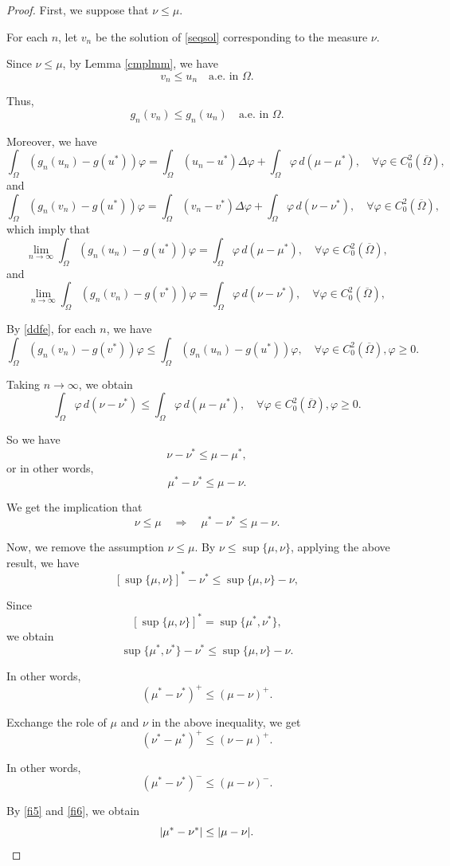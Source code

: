 \documentclass[a4paper, 11pt]{report}
\theoremstyle{definition}\newtheorem*{rmk}{Remark}
\begin{document}
\begin{proof}
\mbox{}

First, we suppose that $\nu \leq \mu$.

For each $n$, let $v_n$ be the solution of \eqref{seqsol} corresponding to the measure $\nu$.

Since $\nu \leq \mu$, by Lemma \ref{cmplmm}, we have
\[
v_n \leq u_n \quad\text{a.e.\ in }\Omega.
\]

Thus,
\begin{equation}\label{ddfe}
g_n(v_n) \leq g_n(u_n)\quad\text{a.e.\ in }\Omega.
\end{equation}

Moreover, we have
\[
\int_{\Omega}(g_n(u_n)-g(u^*))\varphi = \int_{\Omega} (u_n-u^*) \Delta\varphi + \int_{\Omega}\varphi \,d(\mu - \mu^*),\quad\forall \varphi \in C^2_0(\overline{\Omega}),
\]
and
\[
\int_{\Omega}(g_n(v_n)-g(u^*))\varphi = \int_{\Omega} (v_n-v^*) \Delta\varphi + \int_{\Omega}\varphi \,d(\nu - \nu^*),\quad\forall \varphi \in C^2_0(\overline{\Omega}),
\]
which imply that
\[
\lim\limits_{n\to\infty} \int_{\Omega}(g_n(u_n)-g(u^*))\varphi = \int_{\Omega}\varphi \,d(\mu - \mu^*),\quad\forall \varphi \in C^2_0(\overline{\Omega}),
\]
and
\[
\lim\limits_{n\to\infty} \int_{\Omega}(g_n(v_n)-g(v^*))\varphi = \int_{\Omega}\varphi \,d(\nu - \nu^*),\quad\forall \varphi \in C^2_0(\overline{\Omega}),
\]

By \eqref{ddfe}, for each $n$, we have
\[
 \int_{\Omega}(g_n(v_n)-g(v^*))\varphi \leq  \int_{\Omega}(g_n(u_n)-g(u^*))\varphi, \quad \forall \varphi \in C^2_0(\overline{\Omega}),\varphi\geq 0.
\]

Taking $n \to \infty$, we obtain
\[
\int_{\Omega}\varphi \,d(\nu - \nu^*) \leq \int_{\Omega}\varphi \,d(\mu - \mu^*), \quad\forall \varphi \in C^2_0(\overline{\Omega}),\varphi\geq 0.
\]

So we have
\[
\nu - \nu^* \leq \mu - \mu^*,
\]
or in other words,
\[
\mu^* - \nu^* \leq \mu - \nu.
\]

We get the implication that
\[
\nu\leq \mu \quad\Rightarrow\quad \mu^* - \nu^* \leq \mu - \nu.
\]

Now, we remove the assumption $\nu \leq \mu$. By $\nu \leq \sup\{\mu,\nu\}$, applying the above result, we have
\[
[\sup\{\mu,\nu\}]^* - \nu^* \leq \sup\{\mu,\nu\} - \nu,
\]

Since
\[
[\sup\{\mu,\nu\}]^*=\sup\{\mu^*,\nu^*\},
\]
we obtain
\[
\sup\{\mu^*,\nu^*\} - \nu^* \leq \sup\{\mu,\nu\} - \nu.
\]

In other words,
\begin{equation}\label{fi5}
(\mu^* - \nu^*)^+ \leq (\mu - \nu)^+.
\end{equation}

Exchange the role of $\mu$ and $\nu$ in the above inequality, we get
\[
(\nu^* - \mu^*)^+ \leq (\nu - \mu)^+.
\]

In other words,
\begin{equation}\label{fi6}
(\mu^* - \nu^*)^- \leq (\mu - \nu)^-.
\end{equation}

By \eqref{fi5} and \eqref{fi6}, we obtain
\[
|\mu^* - \nu^*| \le |\mu - \nu|.\qedhere
\]
\end{proof}
\end{document}
